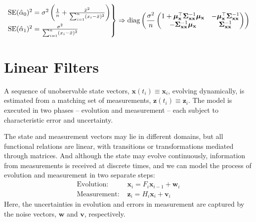 \documentclass[12pt, twoside, draft]{article}
\begin{document}
\begin{equation}
\begin{rcases}
\text{SE}(\hat{\alpha}_0)^2 = \sigma^2 \left( \frac{1}{n} + \frac{\bar{x}^2}{\sum_{i=1}^n (x_i - \bar{x})^2} \right) \\
\text{SE}(\hat{\alpha}_1)^2= \frac{\sigma^2}{\sum_{i=1}^n (x_i - \bar{x})^2}
\end{rcases} \Rightarrow \operatorname{diag} \left( \frac{\sigma^2}{n} 
\begin{pmatrix}
1 + \boldsymbol{\mu}^\top_{\mathbf{x}}\boldsymbol{\Sigma}_{\mathbf{x}\mathbf{x}}^{-1} \boldsymbol{\mu}_{\mathbf{x}} & -\boldsymbol{\mu}^\top_{\mathbf{x}}\boldsymbol{\Sigma}_{\mathbf{x}\mathbf{x}}^{-1} \\
-\boldsymbol{\Sigma}_{\mathbf{x}\mathbf{x}}^{-1} \boldsymbol{\mu}_{\mathbf{x}} & \boldsymbol{\Sigma}_{\mathbf{x}\mathbf{x}}^{-1}
\end{pmatrix} \right)
\end{equation}



\section{Linear Filters}\label{sec:linear_filter}
A sequence of unobservable state vectors, $\mathbf{x}(t_i) \equiv \mathbf{x}_i$, evolving dynamically, is estimated from a matching set of measurements, $\mathbf{z}(t_i) \equiv \mathbf{z}_i$.  The model is executed in two phases -- evolution and measurement -- each subject to characteristic error and uncertainty.

The state and measurement vectors may lie in different domains, but all functional relations are linear, with transitions or transformations mediated through matrices.  And although the state may evolve continuously, information from measurements is received at discrete times, and we can model the process of evolution and measurement in two separate steps:
\begin{align}
\text{Evolution: } & \mathbf{x}_{i} = F_i \mathbf{x}_{i-1} + \mathbf{w}_i \label{eq:linear_filter_evolution}\\
\text{Measurement: } & \mathbf{z}_{i} = H_i \mathbf{x}_i + \mathbf{v}_i \label{eq:linear_filter_measurement}
\end{align}
Here, the uncertainties in evolution and errors in measurement are captured by the noise vectors, $\mathbf{w}$ and $\mathbf{v}$, respectively.
\end{document}
